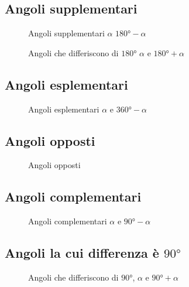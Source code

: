 \subsection{Angoli supplementari}
\begin{figure}
	\centering
	
	\caption{Angoli supplementari $\alpha$ $\ang{180}-\alpha$}
	\label{fig:graficiAngoliAssociatisupplementari}
\end{figure}
\begin{figure}
	\centering
	
	\caption{Angoli che differiscono di $\ang{180}$ $\alpha$ e $\ang{180}+\alpha$}
	\label{fig:graficiAngoliAssociatidiff180}
\end{figure}
\subsection{Angoli esplementari}
\begin{figure} %
	\centering
	
	\caption{Angoli esplementari $\alpha$ e $\ang{360}-\alpha$}
	\label{fig:graficiAngolidif360}
\end{figure}
\subsection{Angoli opposti}
\begin{figure} %
	\centering
	
	\caption{Angoli opposti}
	\label{fig:graficiangoliopposti}
\end{figure}
\subsection{Angoli complementari}
\begin{figure} %
	\centering
	
	\caption{Angoli complementari $\alpha$ e  $\ang{90}-\alpha$}
	\label{fig:graficiangolicomplementari1}
\end{figure}
\subsection{Angoli la cui differenza è $\ang{90}$}
\begin{figure} %
	\centering
	
	\caption{Angoli che differiscono di $\ang{90}$, $\alpha$ e $\ang{90}+\alpha$}
	\label{fig:graficiangolicomplementari2}
\end{figure}

